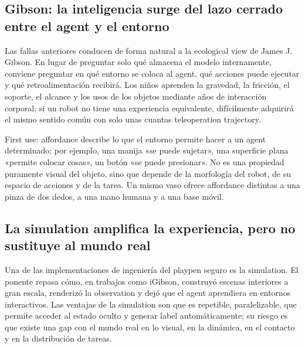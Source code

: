 
\subsection{Gibson: la inteligencia surge del lazo cerrado entre el agent y el entorno}

Las fallas anteriores conducen de forma natural a la ecological view de James J. Gibson. En lugar de preguntar solo qué almacena el modelo internamente, conviene preguntar en qué entorno se coloca al agent, qué acciones puede ejecutar y qué retroalimentación recibirá. Los niños aprenden la gravedad, la fricción, el soporte, el alcance y los usos de los objetos mediante años de interacción corporal; si un robot no tiene una experiencia equivalente, difícilmente adquirirá el mismo sentido común con solo unas cuantas teleoperation trajectory.


\begin{knowledgebox}{First use: affordance}
 describe lo que el entorno permite hacer a un agent determinado; por ejemplo, una manija «se puede sujetar», una superficie plana «permite colocar cosas», un botón «se puede presionar». No es una propiedad puramente visual del objeto, sino que depende de la morfología del robot, de su espacio de acciones y de la tarea. Un mismo vaso ofrece affordance distintas a una pinza de dos dedos, a una mano humana y a una base móvil.
\end{knowledgebox}

\subsection{La simulation amplifica la experiencia, pero no sustituye al mundo real}

Una de las implementaciones de ingeniería del playpen seguro es la simulation. El ponente repasa cómo, en trabajos como iGibson, construyó escenas interiores a gran escala, renderizó la observation y dejó que el agent aprendiera en entornos interactivos. Las ventajas de la simulation son que es repetible, paralelizable, que permite acceder al estado oculto y generar label automáticamente; su riesgo es que existe una gap con el mundo real en lo visual, en la dinámica, en el contacto y en la distribución de tareas.

